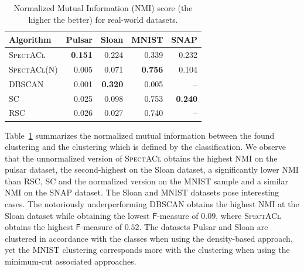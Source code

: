 \begin{table}%
	\centering
	\begin{tabular}{lrrrr}\toprule
	Algorithm & Pulsar & Sloan & MNIST & SNAP  \\\midrule
    \textsc{SpectACl} &	\textbf{0.151} & 0.224 & 0.339 & 0.232\\
    \textsc{SpectACl}(N) & 0.005 & 0.071 & \textbf{0.756} & 0.104\\
    DBSCAN & 0.001 & \textbf{0.320} & 0.005 & --\\
    \textsc{SC} & 0.025 & 0.098 & 0.753 & \textbf{0.240}\\
    \textsc{RSC} & 0.026 & 0.027 &0.740 & --\\ \bottomrule
    \end{tabular}
\caption{Normalized Mutual Information (NMI) score (the higher the better) for real-world datasets.}
\label{tbl:realNMI}
\end{table}
Table~\ref{tbl:realNMI} summarizes the normalized mutual information between the found clustering and the clustering which is defined by the classification. We observe that the unnormalized version of \textsc{SpectACl} obtains the highest NMI on the pulsar dataset, the second-highest on the Sloan dataset, a significantly lower NMI than \textsc{RSC}, \textsc{SC} and the normalized version on the MNIST sample and a similar NMI on the SNAP dataset. The Sloan and MNIST datasets pose interesting cases. The notoriously underperforming DBSCAN obtains the highest NMI at the Sloan dataset while obtaining the lowest $\mathsf{F}$-measure of $0.09$, where \textsc{SpectACl} obtains the highest $\mathsf{F}$-measure of $0.52$. The datasets Pulsar and Sloan are clustered in accordance with the classes when using the density-based approach, yet the MNIST clustering corresponds more with the clustering when using the minimum-cut associated approaches.

